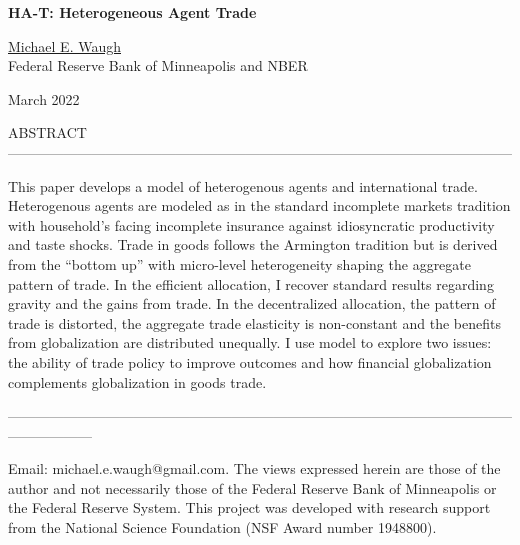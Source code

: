 \documentclass[12pt,pdftex]{article}
\begin{document}
\begin{onehalfspacing}

{\large \textbf{HA-T: Heterogeneous Agent Trade}}

\vspace{1cm}

%

\href{http://www.waugheconomics.com/}{Michael E. Waugh} \\ Federal Reserve Bank of Minneapolis and NBER

\vspace{0.5cm}

March 2022

\vspace{1.5cm}


\normalsize

ABSTRACT ------------------------------------------------------------------------------------------------------------

This paper develops a model of heterogenous agents and international trade. Heterogenous agents are modeled as in the standard incomplete markets tradition with household's facing incomplete insurance against idiosyncratic productivity and taste shocks. Trade in goods follows the Armington tradition but is derived from the ``bottom up'' with micro-level heterogeneity shaping the aggregate pattern of trade. In the efficient allocation, I recover standard results regarding gravity and the gains from trade. In the decentralized allocation, the pattern of trade is distorted, the aggregate trade elasticity is non-constant and the benefits from globalization are distributed unequally. I use model to explore two issues: the ability of trade policy to improve outcomes and how financial globalization complements globalization in goods trade.

------------------------------------------------------------------------------------------------------------------------------
%

\vspace{6.5cm}

\footnotesize Email: michael.e.waugh@gmail.com. The views expressed herein are those of the author and not necessarily those of the Federal
Reserve Bank of Minneapolis or the Federal Reserve System. This project was developed with research support from the National Science Foundation (NSF Award number 1948800).


\end{onehalfspacing}
\end{document}
